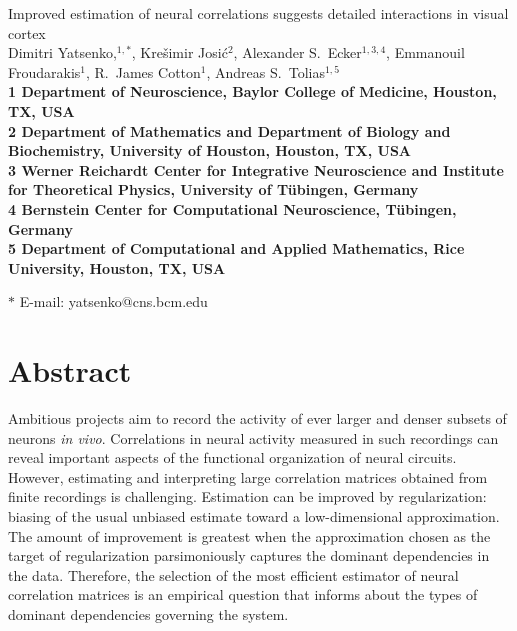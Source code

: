 \documentclass[10pt]{article}
\date{}
\begin{document}
\begin{flushleft}
{\Large
Improved estimation of neural correlations suggests detailed interactions in visual cortex
}
\\
Dimitri Yatsenko,$^{1,\ast}$, 
Kre\v{s}imir Josi\'{c}$^{2}$,
Alexander S.~Ecker$^{1,3,4}$,
Emmanouil Froudarakis$^{1}$,
R.~James Cotton$^{1}$,
Andreas S.~Tolias$^{1,5}$
\\
\bf{1} Department of Neuroscience, Baylor College of Medicine, Houston, TX, USA
\\
\bf{2} Department of Mathematics and Department of Biology and Biochemistry, University of Houston, Houston, TX, USA
\\
\bf{3}  Werner Reichardt Center for Integrative Neuroscience and Institute for Theoretical Physics, University of T\"ubingen, Germany
\\
\bf{4} Bernstein Center for Computational Neuroscience, T\"ubingen, Germany
\\
\bf{5} Department of Computational and Applied Mathematics, Rice University, Houston, TX, USA

$\ast$ E-mail: yatsenko@cns.bcm.edu
\end{flushleft}

\section*{Abstract}
Ambitious projects aim to record the activity of ever larger and denser subsets of neurons \emph{in vivo}.  Correlations in neural activity measured in such recordings can reveal important aspects of the functional organization of neural circuits.  However, estimating and interpreting large correlation matrices obtained from finite recordings is challenging.  Estimation can be improved by regularization: biasing of the usual unbiased estimate toward a low-dimensional approximation.  The amount of improvement is greatest when the approximation chosen as the target of regularization parsimoniously captures the dominant dependencies in the data.  Therefore, the selection of the most efficient estimator of neural correlation matrices is an empirical question that informs about the types of dominant dependencies governing the system.
\end{document}
